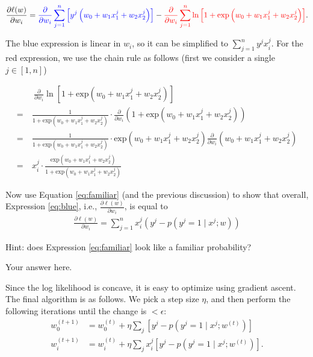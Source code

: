 \documentclass[a4paper]{article}
\theoremstyle{definition}
\begin{document}
	\begin{align} \label{eq:blue}
		\frac{\partial \ell(w)}{\partial w_i}={\color{blue} \frac{\partial }{\partial w_i} \sum_{j=1}^n\left[y^j\left(w_0+w_1 x_1^j+w_2 x_2^j\right)\right] }
		-{\color{red} \frac{\partial }{\partial w_i}\sum_{j=1}^n\ln\left[ 1+\text{exp}\left( w_0+w_1 x_1^j+w_2 x_2^j\right)\right] } .
	\end{align}
	
	
	The blue expression is linear in $w_i$, so it can be simplified to $\sum_{j=1}^n y^j x_i^j$.
	For the red expression, we use the chain rule as follows (first we consider a single $j\in [1,n]$)
	
	
	\begin{align}
		&~\frac{\partial}{\partial w_i} \ln\left[ 1+\text{exp}\left( w_0+w_1 x_1^j+w_2 x_2^j\right)\right]\\
		=~& \frac{1}{1+\text{exp}\left(w_0+w_1 x_1^j+w_2 x_2^j \right)}
		\cdot \frac{\partial }{\partial w_i}\left(1+\text{exp}\left(w_0+w_1 x_1^j+w_2 x_2^j \right)\right)\\
		=~& \frac{1}{1+\text{exp}\left(w_0+w_1 x_1^j+w_2 x_2^j \right)}
		\cdot \text{exp}\left(w_0+w_1 x_1^j+w_2 x_2^j \right)
		\frac{\partial}{\partial w_i}\left(w_0+w_1 x_1^j+w_2 x_2^j \right)\\
		=~&x_i^j \cdot \frac{\text{exp}\left(w_0+w_1 x_1^j+w_2 x_2^j\right)}
		{1+\text{exp}\left(w_0+w_1 x_1^j+w_2 x_2^j \right) } \label{eq:familiar}
	\end{align}
	
	Now use Equation \ref{eq:familiar} (and the previous discussion) to show that overall,
	Expression \ref{eq:blue}, i.e., $\frac{\partial \ell(w)}{\partial w_i}$, is equal to
	\begin{align} \label{eq:mcle1}
		\frac{\partial \ell(w)}{\partial w_i} =\sum_{j = 1}^{n} x_i^j(y^j - p(y^j=1 \mid x^j; w)) 
	\end{align}
	
	
	Hint: does Expression \ref{eq:familiar} look like a familiar probability? 
	
	
	
	
	{\color{blue} Your answer here.}



Since the log likelihood is concave, it is easy to optimize using gradient ascent.
The final algorithm is as follows. We pick a step size $\eta$,
and then perform the following iterations until the change is $<\epsilon$:
\begin{align}
	w_0^{(t+1)}&=w_0^{(t)}+\eta\sum_j\left[y^j-p(y^j=1\mid x^j;w^{(t)})\right] \\
	w_i^{(t+1)}&=w_i^{(t)}+\eta\sum_j x_i^j\left[y^j-p(y^j=1\mid x^j;w^{(t)})\right]. 
\end{align}
\end{document}

